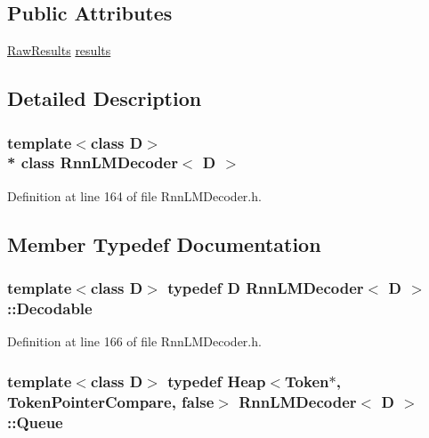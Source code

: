 \subsection*{Public Attributes}
\begin{DoxyCompactItemize}
\item 
\hyperlink{class_rnn_l_m_decoder_af7ccd067ad2bf3f6a77183e312df3900}{Raw\+Results} \hyperlink{class_rnn_l_m_decoder_a1f394450c2b0322b37e19bfb94a9f8b0}{results}
\end{DoxyCompactItemize}


\subsection{Detailed Description}
\subsubsection*{template$<$class D$>$\\*
class Rnn\+L\+M\+Decoder$<$ D $>$}



Definition at line 164 of file Rnn\+L\+M\+Decoder.\+h.



\subsection{Member Typedef Documentation}
\subsubsection[{Decodable}]{\setlength{\rightskip}{0pt plus 5cm}template$<$class D$>$ typedef D {\bf Rnn\+L\+M\+Decoder}$<$ D $>$\+::{\bf Decodable}}\hypertarget{class_rnn_l_m_decoder_a96cefe4263b117d36af4220f6716a788}{}\label{class_rnn_l_m_decoder_a96cefe4263b117d36af4220f6716a788}


Definition at line 166 of file Rnn\+L\+M\+Decoder.\+h.

\subsubsection[{Queue}]{\setlength{\rightskip}{0pt plus 5cm}template$<$class D$>$ typedef Heap$<${\bf Token}$\ast$, {\bf Token\+Pointer\+Compare}, false$>$ {\bf Rnn\+L\+M\+Decoder}$<$ D $>$\+::{\bf Queue}}\hypertarget{class_rnn_l_m_decoder_ab653813a7dbee6c9ea6948f414d2b128}{}\label{class_rnn_l_m_decoder_ab653813a7dbee6c9ea6948f414d2b128}


